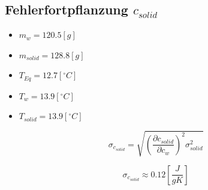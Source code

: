 \documentclass[10pt,a4paper]{article}
\begin{document}
\subsection{Fehlerfortpflanzung $c_{solid}$}

\begin{itemize}
    \item $m_w = 120.5 [g]$
    \item $m_{solid} = 128.8 [g]$
    \item $T_{Eq} = 12.7 [^{\circ} C]$
    \item $T_w = 13.9 [^{\circ} C]$
    \item $T_{solid} = 13.9 [^{\circ} C]$
\end{itemize}

\begin{equation}
    \sigma_{c_{solid}} = \sqrt{ \left(\frac{\partial c_{solid}}{\partial c_w}\right)^2 \sigma_{solid}^2}
\end{equation}

\begin{equation}
    \sigma_{c_{solid}} \approx 0.12 \left[\frac{J}{g K}\right]
\end{equation}

\centerline{}


\end{document}
